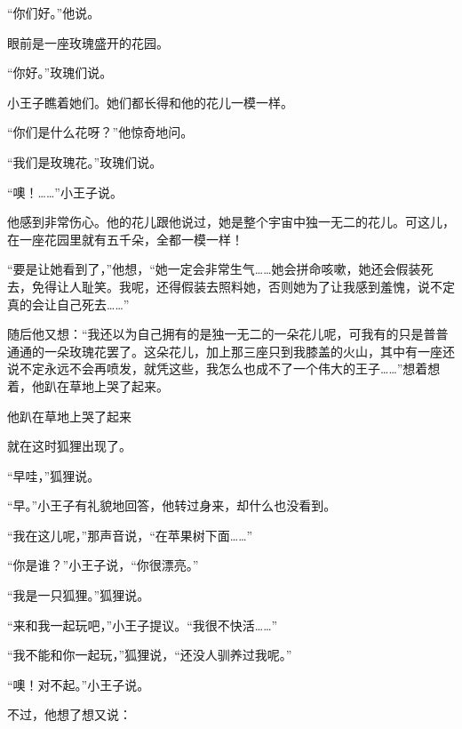 “你们好。”他说。

眼前是一座玫瑰盛开的花园。

“你好。”玫瑰们说。

小王子瞧着她们。她们都长得和他的花儿一模一样。

“你们是什么花呀？”他惊奇地问。

“我们是玫瑰花。”玫瑰们说。

“噢！\ldots{}\ldots{}”小王子说。

他感到非常伤心。他的花儿跟他说过，她是整个宇宙中独一无二的花儿。可这儿，在一座花园里就有五千朵，全都一模一样！

{\startalignment[center]
 \stopalignment}

“要是让她看到了，”他想，“她一定会非常生气\ldots{}\ldots{}她会拼命咳嗽，她还会假装死去，免得让人耻笑。我呢，还得假装去照料她，否则她为了让我感到羞愧，说不定真的会让自己死去\ldots{}\ldots{}”

随后他又想：“我还以为自己拥有的是独一无二的一朵花儿呢，可我有的只是普普通通的一朵玫瑰花罢了。这朵花儿，加上那三座只到我膝盖的火山，其中有一座还说不定永远不会再喷发，就凭这些，我怎么也成不了一个伟大的王子\ldots{}\ldots{}”想着想着，他趴在草地上哭了起来。

{\startalignment[center]
 \stopalignment}

他趴在草地上哭了起来


\stoptitle

\starttitle[title={21},reference={part0023.html_a024}]

就在这时狐狸出现了。

“早哇，”狐狸说。

“早。”小王子有礼貌地回答，他转过身来，却什么也没看到。

“我在这儿呢，”那声音说，“在苹果树下面\ldots{}\ldots{}”

“你是谁？”小王子说，“你很漂亮。”

“我是一只狐狸。”狐狸说。

“来和我一起玩吧，”小王子提议。“我很不快活\ldots{}\ldots{}”

“我不能和你一起玩，”狐狸说，“还没人驯养过我呢。”

“噢！对不起。”小王子说。

不过，他想了想又说：

